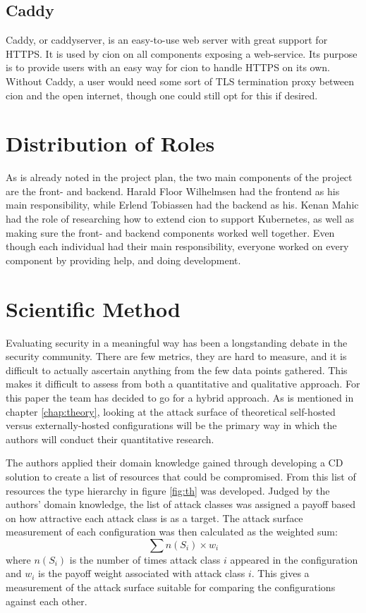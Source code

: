\subsection{Caddy}
Caddy, or caddyserver, is an easy-to-use web server with great support for HTTPS\cite{caddyserver}. It is used by cion on all components exposing a web-service. Its purpose is to provide users with an easy way for cion to handle HTTPS on its own. Without Caddy, a user would need some sort of TLS termination proxy between cion and the open internet, though one could still opt for this if desired.

\section{Distribution of Roles}
As is already noted in the project plan, the two main components of the project are the front- and backend. Harald Floor Wilhelmsen had the frontend as his main responsibility, while Erlend Tobiassen had the backend as his. Kenan Mahic had the role of researching how to extend cion to support Kubernetes, as well as making sure the front- and backend components worked well together. Even though each individual had their main responsibility, everyone worked on every component by providing help, and doing development.

\section{Scientific Method}
\label{sec:sciencemethod}
Evaluating security in a meaningful way has been a longstanding debate in the security community. There are few metrics, they are hard to measure, and it is difficult to actually ascertain anything from the few data points gathered. This makes it difficult to assess from both a quantitative and qualitative approach. For this paper the team has decided to go for a hybrid approach. As is mentioned in chapter \ref{chap:theory}, looking at the attack surface of theoretical self-hosted versus externally-hosted configurations will be the primary way in which the authors will conduct their quantitative research.

The authors applied their domain knowledge gained through developing a \acrshort{CD} solution to create a list of resources that could be compromised. From this list of resources the type hierarchy in figure \ref{fig:th} was developed. Judged by the authors' domain knowledge, the list of attack classes was assigned a payoff based on how attractive each attack class is as a target. The attack surface measurement of each configuration was then calculated as the weighted sum:
\[
\sum n(S_i)\times w_i
\]
where $n(S_i)$ is the number of times attack class $i$ appeared in the configuration and $w_i$ is the payoff weight associated with attack class $i$. This gives a measurement of the attack surface suitable for comparing the configurations against each other.

